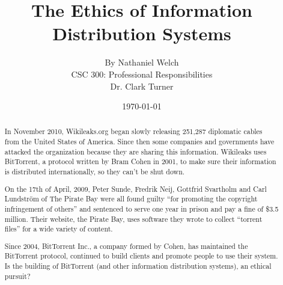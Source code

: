\documentclass[11pt]{article}
\begin{document}
\title{\vfill The Ethics of Information Distribution Systems} %
\author{
By Nathaniel Welch\vspace{10pt}\\
CSC 300: Professional Responsibilities\vspace{10pt}\\
Dr. Clark Turner\vspace{10pt}\\
}
\date{\today}

\maketitle

\vfill %
\begin{abstract}

In November 2010, Wikileaks.org began slowly releasing 251,287 diplomatic cables from the United States of America. \cite{cablegate} Since then some companies and governments have attacked the organization because they are sharing this information. Wikileaks uses BitTorrent, a protocol written by Bram Cohen in 2001, to make sure their information is distributed internationally, so they can't be shut down.

On the 17th of April, 2009, Peter Sunde, Fredrik Neij, Gottfrid Svartholm and Carl Lundström of The Pirate Bay were all found guilty ``for promoting the copyright infringement of others'' and sentenced to serve one year in prison and pay a fine of \$3.5 million. \cite{tpbverdict} Their website, the Pirate Bay, uses software they wrote to collect ``torrent files'' for a wide variety of content.

Since 2004, BitTorrent Inc., a company formed by Cohen, has maintained the BitTorrent protocol, continued to build clients and promote people to use their system. Is the building of BitTorrent (and other information distribution systems), an ethical pursuit?

\end{abstract}

\thispagestyle{empty} %
\newpage
\end{document}
